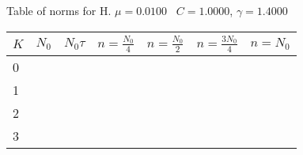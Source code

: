 \begin{center}
Table of norms for H. $\mu = 0.0100$ \, $C = 1.0000$, $\gamma = 1.4000$
  
\begin{tabular}{|p{0.8in}|p{0.8in}|p{0.8in}|p{0.8in}|p{0.8in}|p{0.8in}|p{0.8in}|} \hline
$K$ &$N_0$ &$N_0 \tau$ &$n = \frac{N_0}{4}$ &$n = \frac{N_0}{2}$ &$n = \frac{3N_0}{4}$ &$n = N_0$ \\ \hline 
0 & & & & & & \\ \hline 
1 & & & & & & \\ \hline 
2 & & & & & & \\ \hline 
3 & & & & & & \\ \hline 

\end{tabular}\\[20pt]
\end{center}
